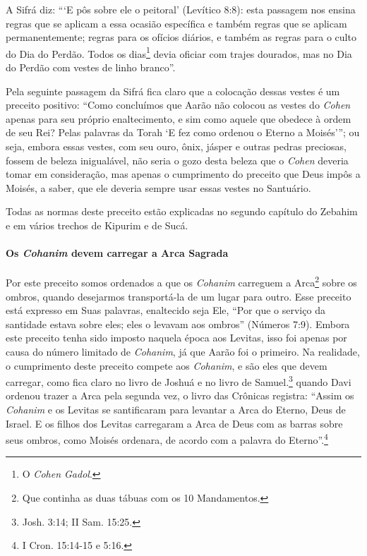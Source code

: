 A Sifrá diz: ```E pôs sobre ele o peitoral' (Levítico 8:8): esta passagem nos ensina regras que se aplicam a essa ocasião específica e também regras
que se aplicam permanentemente; regras para os ofícios diários, e também
as regras para o culto do Dia do Perdão. Todos os dias\footnote{O \textit{Cohen Gadol}.}
devia oficiar com trajes dourados, mas no Dia do Perdão com vestes de linho branco''.

Pela seguinte passagem da Sifrá fica claro que a colocação dessas vestes
é um preceito positivo: ``Como concluímos que Aarão não colocou as
vestes do \textit{Cohen} apenas para seu próprio enaltecimento, e sim como
aquele que obedece à ordem de seu Rei? Pelas palavras da Torah `E fez
como ordenou o Eterno a Moisés'''; ou seja, embora essas vestes, com seu
ouro, ônix, jásper e outras pedras preciosas, fossem de beleza
inigualável, não seria o gozo desta beleza que o \textit{Cohen} deveria tomar
em consideração, mas apenas o cumprimento do preceito que Deus impôs a
Moisés, a saber, que ele deveria sempre usar essas vestes no Santuário.

Todas as normas deste preceito estão explicadas no segundo capítulo do
Zebahim e em vários trechos de Kipurim e de Sucá.

\paragraph{Os \textit{Cohanim} devem carregar a Arca Sagrada}


Por este preceito somos ordenados a que os \textit{Cohanim} carreguem
a Arca\footnote{Que continha as duas tábuas com os 10 Mandamentos.} sobre os ombros, quando desejarmos
transportá-la de um lugar para
outro. Esse preceito está expresso em Suas palavras, enaltecido seja
Ele, ``Por que o serviço da santidade estava sobre eles; eles o levavam aos
ombros'' (Números 7:9). Embora este preceito tenha sido imposto naquela
época aos Levitas, isso foi apenas por causa do número limitado de
\textit{Cohanim}, já que Aarão
foi o primeiro. Na realidade, o cumprimento deste preceito compete aos
\textit{Cohanim}, e são eles que devem carregar, como fica claro no livro de
Joshuá e no livro de Samuel.\footnote{Josh. 3:14; II Sam. 15:25.} quando Davi ordenou trazer a
Arca pela segunda vez, o livro das Crônicas registra: ``Assim os \textit{Cohanim} e os Levitas se santificaram
para levantar a Arca do Eterno, Deus de Israel. E os filhos dos Levitas
carregaram a Arca de Deus com as barras sobre seus ombros, como Moisés
ordenara, de acordo com a palavra do Eterno''.\footnote{I Cron. 15:14-15 e 5:16.}


